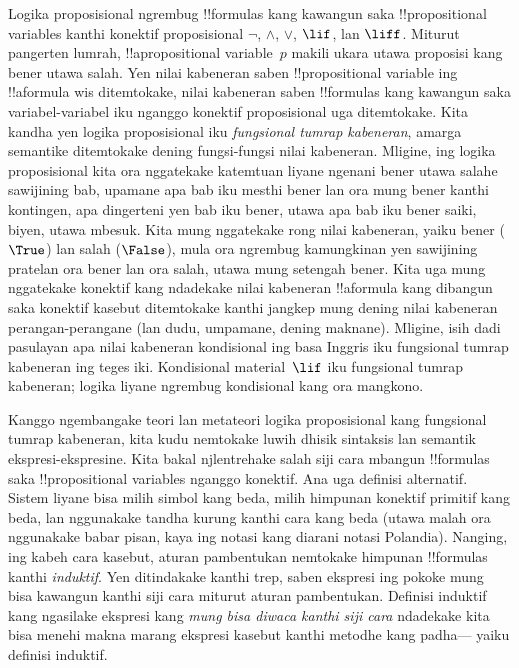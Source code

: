 \documentclass[../../../include/open-logic-section]{subfiles}
\begin{document}


Logika proposisional ngrembug !!{formula}s kang kawangun saka
!!{propositional variable}s kanthi konektif proposisional
$\lnot$, $\land$, $\lor$, $\lif$, lan $\liff$. Miturut pangerten
lumrah, !!a{propositional variable}~$p$ makili ukara utawa proposisi
kang bener utawa salah. Yen nilai kabeneran saben
!!{propositional variable} ing !!a{formula} wis ditemtokake, nilai
kabeneran saben !!{formula}s kang kawangun saka variabel-variabel iku
nganggo konektif proposisional uga ditemtokake. Kita kandha yen
logika proposisional iku \emph{fungsional tumrap kabeneran}, amarga
semantike ditemtokake dening fungsi-fungsi nilai kabeneran. Mligine,
ing logika proposisional kita ora nggatekake katemtuan liyane ngenani
bener utawa salahe sawijining bab, upamane apa bab iku mesthi bener
lan ora mung bener kanthi kontingen, apa dingerteni yen bab iku bener,
utawa apa bab iku bener saiki, biyen, utawa mbesuk. Kita mung
nggatekake rong nilai kabeneran, yaiku bener
($\True$) lan salah ($\False$), mula ora ngrembug kamungkinan yen
sawijining pratelan ora bener lan ora salah, utawa mung setengah bener.
Kita uga mung nggatekake konektif kang ndadekake nilai kabeneran
!!a{formula} kang dibangun saka konektif kasebut ditemtokake kanthi
jangkep mung dening nilai kabeneran perangan-perangane (lan dudu,
umpamane, dening maknane). Mligine, isih dadi pasulayan apa nilai kabeneran
kondisional ing basa Inggris iku fungsional tumrap kabeneran ing
teges iki. Kondisional material~$\lif$ iku fungsional tumrap kabeneran;
logika liyane ngrembug kondisional kang ora mangkono.

Kanggo ngembangake teori lan metateori logika proposisional kang
fungsional tumrap kabeneran, kita kudu nemtokake luwih dhisik
sintaksis lan semantik ekspresi-ekspresine. Kita bakal njlentrehake salah siji
cara mbangun !!{formula}s saka !!{propositional variable}s nganggo
konektif. Ana uga definisi alternatif. Sistem liyane bisa
milih simbol kang beda, milih himpunan konektif primitif kang beda,
lan nggunakake tandha kurung kanthi cara kang beda (utawa malah ora
nggunakake babar pisan, kaya ing notasi kang diarani notasi Polandia).
Nanging, ing kabeh cara kasebut, aturan pambentukan nemtokake himpunan
!!{formula}s kanthi \emph{induktif}. Yen ditindakake kanthi trep, saben
ekspresi ing pokoke mung bisa kawangun kanthi siji cara miturut aturan
pambentukan. Definisi induktif kang ngasilake ekspresi kang
\emph{mung bisa diwaca kanthi siji cara} ndadekake kita
bisa menehi makna marang ekspresi kasebut kanthi metodhe kang padha---
yaiku definisi induktif.
\end{document}
